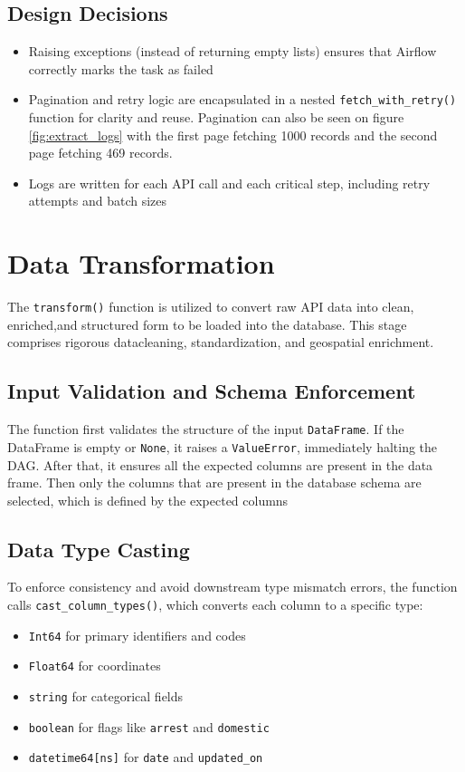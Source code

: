 \documentclass[12pt]{article}
\begin{document}
\subsection*{Design Decisions}
\begin{itemize}
    \item Raising exceptions (instead of returning empty lists) ensures that Airflow correctly marks the task as failed
    \item Pagination and retry logic are encapsulated in a nested \texttt{fetch\_with\_retry()} function for clarity and reuse. Pagination can also be seen on figure \ref{fig:extract_logs} with the first page fetching 1000 records and the second page fetching 469 records.
    \item Logs are written for each API call and each critical step, including retry attempts and batch sizes
\end{itemize}

\section{Data Transformation}

The \texttt{transform()} function is utilized to convert raw API data into clean, enriched,and structured form to be loaded into the database. This stage comprises rigorous datacleaning, standardization, and geospatial enrichment.

\subsection*{Input Validation and Schema Enforcement}
The function first validates the structure of the input \texttt{DataFrame}. If the DataFrame is empty or \texttt{None}, it raises a \texttt{ValueError}, immediately halting the DAG. After that, it ensures all the expected columns are present in the data frame. Then only the columns that are present in the database schema are selected, which is defined by the expected columns

\subsection*{Data Type Casting}
To enforce consistency and avoid downstream type mismatch errors, the function calls \texttt{cast\_column\_types()}, which converts each column to a specific type:
\begin{itemize}
    \item \texttt{Int64} for primary identifiers and codes
    \item \texttt{Float64} for coordinates
    \item \texttt{string} for categorical fields
    \item \texttt{boolean} for flags like \texttt{arrest} and \texttt{domestic}
    \item \texttt{datetime64[ns]} for \texttt{date} and \texttt{updated\_on}
\end{itemize}
\end{document}
